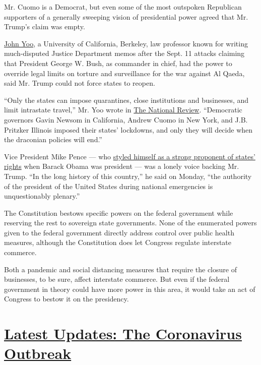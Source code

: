 Mr. Cuomo is a Democrat, but even some of the most outspoken Republican
supporters of a generally sweeping vision of presidential power agreed
that Mr. Trump's claim was empty.

\href{https://www.nationalreview.com/2020/04/no-trump-cant-force-states-to-reopen/}{John
Yoo}, a University of California, Berkeley, law professor known for
writing much-disputed Justice Department memos after the Sept. 11
attacks claiming that President George W. Bush, as commander in chief,
had the power to override legal limits on torture and surveillance for
the war against Al Qaeda, said Mr. Trump could not force states to
reopen.

``Only the states can impose quarantines, close institutions and
businesses, and limit intrastate travel,'' Mr. Yoo wrote in
\href{https://www.nationalreview.com/2020/04/no-trump-cant-force-states-to-reopen/}{The
National Review}. ``Democratic governors Gavin Newsom in California,
Andrew Cuomo in New York, and J.B. Pritzker Illinois imposed their
states' lockdowns, and only they will decide when the draconian policies
will end.''

Vice President Mike Pence --- who
\href{https://robbishop.house.gov/media/press-releases/house-members-take-cause-liberty}{styled
himself as a strong proponent of states' rights} when Barack Obama was
president --- was a lonely voice backing Mr. Trump. ``In the long
history of this country,'' he said on Monday, ``the authority of the
president of the United States during national emergencies is
unquestionably plenary.''

The Constitution bestows specific powers on the federal government while
reserving the rest to sovereign state governments. None of the
enumerated powers given to the federal government directly address
control over public health measures, although the Constitution does let
Congress regulate interstate commerce.

Both a pandemic and social distancing measures that require the closure
of businesses, to be sure, affect interstate commerce. But even if the
federal government in theory could have more power in this area, it
would take an act of Congress to bestow it on the presidency.

\hypertarget{latest-updates-the-coronavirus-outbreak}{%
\section{\texorpdfstring{\href{https://www.nytimes3xbfgragh.onion/2020/09/09/world/covid-19-coronavirus.html?action=click\&pgtype=Article\&state=default\&region=MAIN_CONTENT_1\&context=storylines_live_updates}{Latest
Updates: The Coronavirus
Outbreak}}{Latest Updates: The Coronavirus Outbreak}}\label{latest-updates-the-coronavirus-outbreak}}

